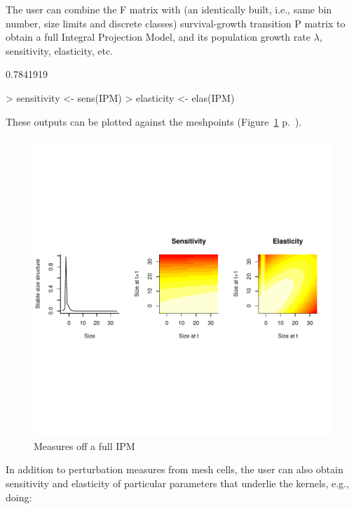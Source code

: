 \documentclass{article}
\begin{document}
The user can combine the F matrix with (an identically built, i.e., same bin number, size limits and discrete classes) survival-growth transition P matrix to
obtain a full Integral Projection Model, and its population growth rate $\lambda$, sensitivity, elasticity, etc. 
\begin{Schunk}
\begin{Soutput}
[1] 0.7841919
\end{Soutput}
\begin{Sinput}
> sensitivity <- sens(IPM)
> elasticity <- elas(IPM)
\end{Sinput}
\end{Schunk}
These outputs can be plotted against the meshpoints (Figure~\ref{fig:four} p.~\pageref{fig:four}).
\begin{figure}
\begin{center}
\includegraphics{IPMpack_Vignette-fig4}
\end{center}
\caption{Measures off a full IPM}
\label{fig:four}
\end{figure}
In addition to perturbation measures from mesh cells, the user can also obtain sensitivity and elasticity of particular parameters that underlie the kernels, e.g., doing:
\end{document}
